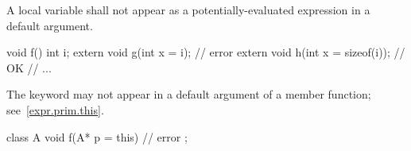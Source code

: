 \pnum
A local variable shall not appear as a potentially-evaluated expression
in a default argument.
\begin{example}
\begin{codeblock}
void f() {
  int i;
  extern void g(int x = i);         // error
  extern void h(int x = sizeof(i)); // OK
  // ...
}
\end{codeblock}
\end{example}

\pnum
\begin{note}
The keyword
may not appear in a default argument of a member function;
see~\ref{expr.prim.this}.
\begin{example}

\begin{codeblock}
class A {
  void f(A* p = this) { }           // error
};
\end{codeblock}
\end{example}
\end{note}


